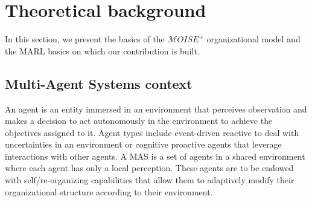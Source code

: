 \documentclass[runningheads]{llncs}
\begin{document}

\section{Theoretical background}





In this section, we present the basics of the $\mathcal{M}OISE^+$ organizational model and the MARL basics on which our contribution is built.

\subsection{Multi-Agent Systems context}


An agent is an entity immersed in an environment that perceives observation and makes a decision to act autonomously in the environment to achieve the objectives assigned to it.
Agent types include event-driven reactive to deal with uncertainties in an environment or cognitive proactive agents that leverage interactions with other agents. A MAS is a set of agents in a shared environment where each agent has only a local perception. These agents are to be endowed with self/re-organizing capabilities that allow them to adaptively modify their organizational structure according to their environment.
\end{document}
